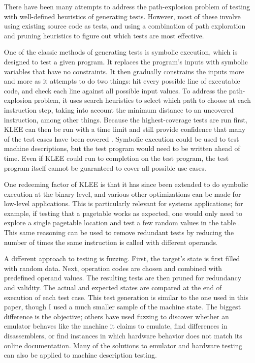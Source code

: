 \documentclass[letterpaper,12pt]{article}
\begin{document}
There have been many attempts to address the path-explosion problem of testing with well-defined heuristics of generating tests. However, most of these involve using existing source code as tests, and using a combination of path exploration and pruning heuristics to figure out which tests are most effective.

One of the classic methods of generating tests is symbolic execution, which is designed to test a given program. It replaces the program's inputs with symbolic variables that have no constraints. It then gradually constrains the inputs more and more as it attempts to do two things: hit every possible line of executable code, and check each line against all possible input values. To address the path-explosion problem, it uses search heuristics to select which path to choose at each instruction step, taking into account the minimum distance to an uncovered instruction, among other things. Because the highest-coverage tests are run first, KLEE can then be run with a time limit and still provide confidence that many of the test cases have been covered \cite{Klee}. Symbolic execution could be used to test machine descriptions, but the test program would need to be written ahead of time. Even if KLEE could run to completion on the test program, the test program itself cannot be guaranteed to cover all possible use cases.

One redeeming factor of KLEE is that it has since been extended to do symbolic execution at the binary level, and various other optimizations can be made for low-level applications. This is particularly relevant for systems applications; for example, if testing that a pagetable works as expected, one would only need to explore a single pagetable location and test a few random values in the table \cite{Path}. This same reasoning can be used to remove redundant tests by reducing the number of times the same instruction is called with different operands.

A different approach to testing is fuzzing. First, the target's state is first filled with random data. Next, operation codes are chosen and combined with predefined operand values. The resulting tests are then pruned for redundancy and validity. The actual and expected states are compared at the end of execution of each test case. This test generation is similar to the one used in this paper, though I used a much smaller sample of the machine state. The biggest difference is the objective; others have used fuzzing to discover whether an emulator behaves like the machine it claims to emulate\cite{Emu}, find differences in disassemblers, or find instances in which hardware behavior does not match its online documentation. Many of the solutions to emulator and hardware testing can also be applied to machine description testing.
\end{document}
